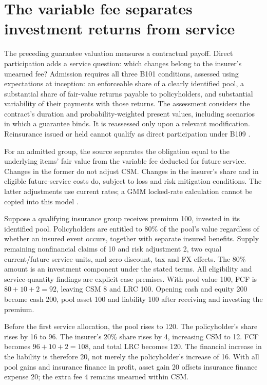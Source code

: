 \section{The variable fee separates investment returns from service}
\label{sec:insurance-variable-fee}

The preceding guarantee valuation measures a contractual payoff. Direct
participation adds a service question: which changes belong to the insurer's
unearned fee? Admission requires all three B101 conditions, assessed using
expectations at inception: an enforceable share of a clearly identified
pool, a substantial share of fair-value returns payable to policyholders,
and substantial variability of their payments with those returns. The
assessment considers the contract's duration and probability-weighted
present values, including scenarios in which a guarantee binds. It is
reassessed only upon a relevant modification. Reinsurance issued or held
cannot qualify as direct participation under B109
\citep[IFRS~17.B101--109]{eu20231803}.

For an admitted group, the source separates the obligation equal to the
underlying items' fair value from the variable fee deducted for future
service. Changes in the former do not adjust CSM. Changes in the insurer's
share and in eligible future-service costs do, subject to loss and risk
mitigation conditions. The latter adjustments use current rates; a GMM
locked-rate calculation cannot be copied into this model
\citep[IFRS~17.45,B104,B110--114]{eu20231803}.

Suppose a qualifying insurance group receives premium 100, invested in its
identified pool. Policyholders are entitled to 80\% of the pool's value
regardless of whether an insured event occurs, together with separate
insured benefits. Supply remaining nonfinancial claims of 10 and risk
adjustment 2, two equal current/future service units, and zero discount,
tax and FX effects. The 80\% amount is an investment component under the
stated terms. All eligibility and service-quantity findings are explicit
case premises. With pool value 100, FCF is \(80+10+2=92\), leaving
CSM 8 and LRC 100. Opening cash and equity 200 become cash 200, pool
asset 100 and liability 100 after receiving and investing the premium.

Before the first service allocation, the pool rises to 120. The
policyholder's share rises by 16 to 96. The insurer's 20\% share rises
by 4, increasing CSM to 12. FCF becomes \(96+10+2=108\), and total
LRC becomes 120. The financial increase in the liability is therefore 20,
not merely the policyholder's increase of 16. With all pool gains and
insurance finance in profit, asset gain 20 offsets insurance finance
expense 20; the extra fee 4 remains unearned within CSM.

